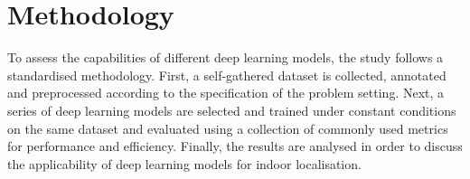 \documentclass[a4paper]{article}
\begin{document}
% 
% 
% 
% 
% 
% 
% 
% 



\section{Methodology} %
\label{sec:methodology}

To assess the capabilities of different deep learning models, the study follows
a standardised methodology. First, a self-gathered dataset is collected,
annotated and preprocessed according to the specification of the problem
setting. Next, a series of deep learning models are selected and trained under
constant conditions on the same dataset and evaluated using a collection of
commonly used metrics for performance and efficiency. Finally, the results are
analysed in order to discuss the applicability of deep learning models for
indoor localisation.
\end{document}
